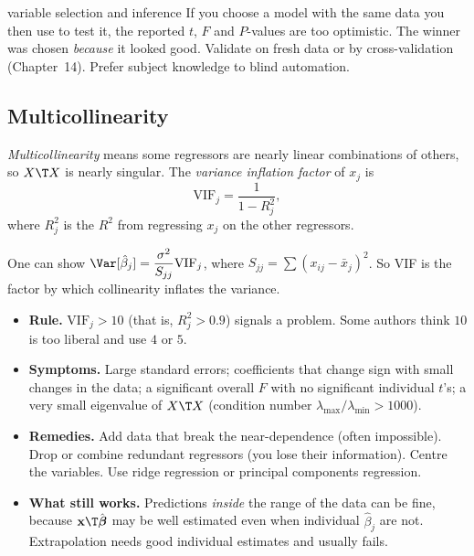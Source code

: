 \begin{pitfall}{variable selection and inference}
If you choose a model with the same data you then use to test it, the reported $t$, $F$ and $P$-values are too optimistic. The winner was chosen \emph{because} it looked good. Validate on fresh data or by cross-validation (Chapter~14). Prefer subject knowledge to blind automation.
\end{pitfall}

\subsection{Multicollinearity}

\begin{definition}
\emph{Multicollinearity} means some regressors are nearly linear combinations of others, so $X\T X$ is nearly singular. The \emph{variance inflation factor} of $x_j$ is
\[ \mathrm{VIF}_j=\frac1{1-R_j^2}, \]
where $R_j^2$ is the $R^2$ from regressing $x_j$ on the other regressors.
\end{definition}

One can show $\Var[\hat\beta_j]=\dfrac{\sigma^2}{S_{jj}}\mathrm{VIF}_j$, where $S_{jj}=\sum(x_{ij}-\bar{x}_j)^2$. So VIF is the factor by which collinearity inflates the variance.

\begin{itemize}
  \item \textbf{Rule.} $\mathrm{VIF}_j>10$ (that is, $R_j^2>0.9$) signals a problem. Some authors think $10$ is too liberal and use $4$ or $5$.
  \item \textbf{Symptoms.} Large standard errors; coefficients that change sign with small changes in the data; a significant overall $F$ with no significant individual $t$'s; a very small eigenvalue of $X\T X$ (condition number $\lambda_{\max}/\lambda_{\min}>1000$).
  \item \textbf{Remedies.} Add data that break the near-dependence (often impossible). Drop or combine redundant regressors (you lose their information). Centre the variables. Use ridge regression or principal components regression.
  \item \textbf{What still works.} Predictions \emph{inside} the range of the data can be fine, because $\mathbf{x}\T\hat{\boldsymbol\beta}$ may be well estimated even when individual $\hat\beta_j$ are not. Extrapolation needs good individual estimates and usually fails.
\end{itemize}

